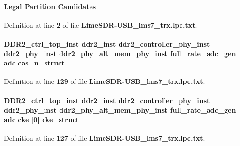 \paragraph[{Candidates}]{\setlength{\rightskip}{0pt plus 5cm}Legal Partition Candidates}\label{LimeSDR-USB__lms7__trx_8lpc_8txt_aac45d107ab5d16791722197e9bbd1c2d}


Definition at line {\bf 2} of file {\bf Lime\+S\+D\+R-\/\+U\+S\+B\+\_\+lms7\+\_\+trx.\+lpc.\+txt}.

\paragraph[{cas\+\_\+n\+\_\+struct}]{ {\bf D\+D\+R2\+\_\+ctrl\+\_\+top\+\_\+inst} {\bf ddr2\+\_\+inst} {\bf ddr2\+\_\+controller\+\_\+phy\+\_\+inst} {\bf ddr2\+\_\+phy\+\_\+inst} {\bf ddr2\+\_\+phy\+\_\+alt\+\_\+mem\+\_\+phy\+\_\+inst} full\+\_\+rate\+\_\+adc\+\_\+gen {\bf adc} cas\+\_\+n\+\_\+struct}\label{LimeSDR-USB__lms7__trx_8lpc_8txt_a4cacf8498e0629dd9cc21283f09c901e}


Definition at line {\bf 129} of file {\bf Lime\+S\+D\+R-\/\+U\+S\+B\+\_\+lms7\+\_\+trx.\+lpc.\+txt}.

\paragraph[{cke\+\_\+struct}]{ {\bf D\+D\+R2\+\_\+ctrl\+\_\+top\+\_\+inst} {\bf ddr2\+\_\+inst} {\bf ddr2\+\_\+controller\+\_\+phy\+\_\+inst} {\bf ddr2\+\_\+phy\+\_\+inst} {\bf ddr2\+\_\+phy\+\_\+alt\+\_\+mem\+\_\+phy\+\_\+inst} full\+\_\+rate\+\_\+adc\+\_\+gen {\bf adc} cke [0] cke\+\_\+struct}\label{LimeSDR-USB__lms7__trx_8lpc_8txt_a036a7188c8db47fa925729369121ea1b}


Definition at line {\bf 127} of file {\bf Lime\+S\+D\+R-\/\+U\+S\+B\+\_\+lms7\+\_\+trx.\+lpc.\+txt}.


